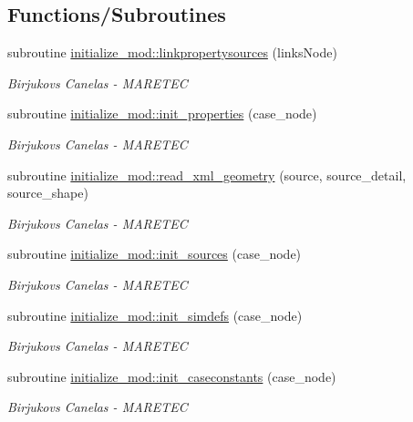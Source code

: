 \subsection*{Functions/\+Subroutines}
\begin{DoxyCompactItemize}
\item 
subroutine \hyperlink{namespaceinitialize__mod_af38ade977df8d56db1d125bc4cc03a4a}{initialize\+\_\+mod\+::linkpropertysources} (links\+Node)
\begin{DoxyCompactList}\small\item\em Birjukovs Canelas -\/ M\+A\+R\+E\+T\+EC \end{DoxyCompactList}\item 
subroutine \hyperlink{namespaceinitialize__mod_a4c7a93dca8bb7b573e91f877033ab22a}{initialize\+\_\+mod\+::init\+\_\+properties} (case\+\_\+node)
\begin{DoxyCompactList}\small\item\em Birjukovs Canelas -\/ M\+A\+R\+E\+T\+EC \end{DoxyCompactList}\item 
subroutine \hyperlink{namespaceinitialize__mod_aebe8236f74bc6665b16463683c478602}{initialize\+\_\+mod\+::read\+\_\+xml\+\_\+geometry} (source, source\+\_\+detail, source\+\_\+shape)
\begin{DoxyCompactList}\small\item\em Birjukovs Canelas -\/ M\+A\+R\+E\+T\+EC \end{DoxyCompactList}\item 
subroutine \hyperlink{namespaceinitialize__mod_aae6a35bca190cdf65a6146f254264cd1}{initialize\+\_\+mod\+::init\+\_\+sources} (case\+\_\+node)
\begin{DoxyCompactList}\small\item\em Birjukovs Canelas -\/ M\+A\+R\+E\+T\+EC \end{DoxyCompactList}\item 
subroutine \hyperlink{namespaceinitialize__mod_a18736cca205403067232125b8e510ab2}{initialize\+\_\+mod\+::init\+\_\+simdefs} (case\+\_\+node)
\begin{DoxyCompactList}\small\item\em Birjukovs Canelas -\/ M\+A\+R\+E\+T\+EC \end{DoxyCompactList}\item 
subroutine \hyperlink{namespaceinitialize__mod_a9d19665b9ac12c3db8b0842bfdb6fa0c}{initialize\+\_\+mod\+::init\+\_\+caseconstants} (case\+\_\+node)
\begin{DoxyCompactList}\small\item\em Birjukovs Canelas -\/ M\+A\+R\+E\+T\+EC \end{DoxyCompactList}\item 

\end{DoxyCompactItemize}
